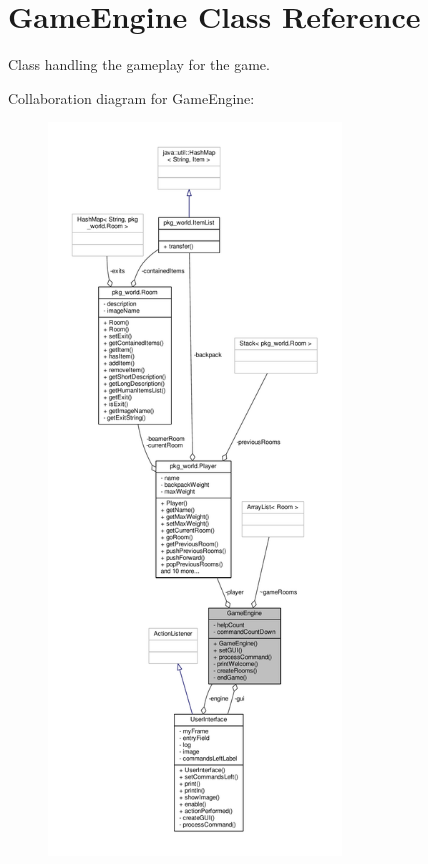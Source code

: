 \hypertarget{classGameEngine}{\section{Game\-Engine Class Reference}
\label{classGameEngine}
}


Class handling the gameplay for the game.  




Collaboration diagram for Game\-Engine\-:\nopagebreak
\begin{figure}[H]
\begin{center}
\leavevmode
\includegraphics[height=550pt]{classGameEngine__coll__graph}
\end{center}
\end{figure}
